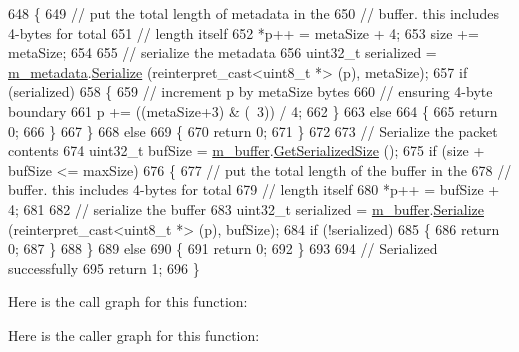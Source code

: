 \begin{DoxyCode}
648     \{
649       \textcolor{comment}{// put the total length of metadata in the}
650       \textcolor{comment}{// buffer. this includes 4-bytes for total }
651       \textcolor{comment}{// length itself}
652       *p++ = metaSize + 4;
653       size += metaSize;
654 
655       \textcolor{comment}{// serialize the metadata}
656       uint32\_t serialized = \hyperlink{classns3_1_1Packet_af3f95fba7966191bd152bcedd5fbcd6b}{m\_metadata}.\hyperlink{classns3_1_1PacketMetadata_aae036ce6844106a8a3ce88e0e095a7eb}{Serialize} (reinterpret\_cast<uint8\_t *> (p), 
      metaSize);
657       \textcolor{keywordflow}{if} (serialized)
658         \{
659           \textcolor{comment}{// increment p by metaSize bytes}
660           \textcolor{comment}{// ensuring 4-byte boundary}
661           p += ((metaSize+3) & (~3)) / 4;
662         \}
663       \textcolor{keywordflow}{else}
664         \{
665           \textcolor{keywordflow}{return} 0;
666         \}
667     \}
668   \textcolor{keywordflow}{else}
669     \{
670       \textcolor{keywordflow}{return} 0;
671     \}
672 
673   \textcolor{comment}{// Serialize the packet contents}
674   uint32\_t bufSize = \hyperlink{classns3_1_1Packet_a0f17bc9b4177865c9fe48fc927d57996}{m\_buffer}.\hyperlink{classns3_1_1Buffer_a0d38b182a66558a719a17ab749643c21}{GetSerializedSize} ();
675   \textcolor{keywordflow}{if} (size + bufSize <= maxSize)
676     \{
677       \textcolor{comment}{// put the total length of the buffer in the}
678       \textcolor{comment}{// buffer. this includes 4-bytes for total }
679       \textcolor{comment}{// length itself}
680       *p++ = bufSize + 4;
681 
682       \textcolor{comment}{// serialize the buffer}
683       uint32\_t serialized = \hyperlink{classns3_1_1Packet_a0f17bc9b4177865c9fe48fc927d57996}{m\_buffer}.\hyperlink{classns3_1_1Buffer_af32e7e0a4e53c5a7e3b4e921ccb07aa8}{Serialize} (reinterpret\_cast<uint8\_t *> (p), bufSize);
684       \textcolor{keywordflow}{if} (!serialized)
685         \{
686           \textcolor{keywordflow}{return} 0;
687         \}
688     \}
689   \textcolor{keywordflow}{else}
690     \{
691       \textcolor{keywordflow}{return} 0;
692     \}
693 
694   \textcolor{comment}{// Serialized successfully}
695   \textcolor{keywordflow}{return} 1;
696 \}
\end{DoxyCode}


Here is the call graph for this function\+:




Here is the caller graph for this function\+:


